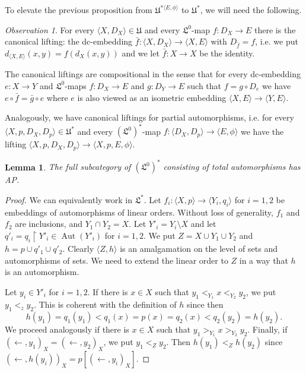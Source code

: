 \documentclass[oneside,notitlepage,12pt]{article}
\newtheorem{lm}[tw]{Lemma}
\theoremstyle{definition}
\theoremstyle{remark}
\newtheorem{observation}[tw]{Observation}
\newcommand \seq [1]{\langle #1 \rangle}
\newcommand \maps {\colon} %
\newcommand \im [1]{[#1]} %
\newcommand \from {\leftarrow}
\newcommand \cmp {\circ} %
\newcommand \Lin {\mathfrak{L}}
\newcommand \Ult {\mathfrak{U}}
\newcommand \Aut {\operatorname{Aut}}
\let \aut \Aut
\begin{document}
To elevate the previous proposition from $\Ult^{*\seq{E, \phi}}$ to $\Ult^*$, we will need the following.

\begin{observation} \label{obs:liftings}
    For every $\seq{X, D_X} \in \Ult$ and every $\Lin^0$-map $f\maps D_X \to E$ there is the canonical lifting: the dc-embedding $\bar{f}\maps \seq{X, D_X} \to \seq{X, E}$ with $D_{\bar{f}} = f$, i.e. we put $d_{\seq{X, E}}(x, y) = f(d_X(x, y))$ and we let $\bar{f}\maps X \to X$ be the identity.
    
    The canonical liftings are compositional in the sense that for every dc-embedding $e\maps X \to Y$ and $\Lin^0$-maps $f\maps D_X \to E$ and $g\maps D_Y \to E$ such that $f = g \cmp D_e$ we have $e \cmp \bar{f} = \bar{g} \cmp e$ where $e$ is also viewed as an isometric embedding $\seq{X, E} \to \seq{Y, E}$.
    
    Analogously, we have canonical liftings for partial automorphisms, i.e. for every $\seq{X, p, D_X, D_p} \in \Ult^*$ and every $(\Lin^0)^*$-map $f\maps \seq{D_X, D_p} \to \seq{E, \phi}$ we have the lifting $\seq{X, p, D_X, D_p} \to \seq{X, p, E, \phi}$.
\end{observation}

\begin{lm} \label{thm:order_auto_amalagamation}
    The full subcategory of $(\Lin^0)^*$ consisting of total automorphisms has AP.
\end{lm}
\begin{proof}
    We can equivalently work in $\Lin^*$.
    Let $f_i\maps \seq{X, p} \to \seq{Y_i, q_i}$ for $i = 1, 2$ be embeddings of automorphisms of linear orders.
    Without loss of generality, $f_1$ and $f_2$ are inclusions, and $Y_1 \cap Y_2 = X$.
    Let $Y'_i = Y_i \setminus X$ and let $q'_i=q_i\restriction Y'_i \in \aut(Y'_i)$ for $i = 1, 2$.
    We put $Z = X \cup Y_1 \cup Y_2$ and $h = p \cup q'_1 \cup q'_2$.
    Clearly $\seq{Z, h}$ is an amalgamation on the level of sets and automorphisms of sets.
    We need to extend the linear order to $Z$ in a way that $h$ is an automorphism.

    Let $y_i \in Y'_i$ for $i = 1, 2$.
    If there is $x \in X$ such that $y_1 <_{Y_1} x <_{Y_2} y_2$, we put $y_1 <_z y_2$.
    This is coherent with the definition of $h$ since then
    \[
        h(y_1) = q_1(y_1) < q_1(x) = p(x) = q_2(x) < q_2(y_2) = h(y_2).
    \]
    We proceed analogously if there is $x \in X$ such that $y_1 >_{Y_1} x >_{Y_2} y_2$.
    Finally, if $(\from, y_1)_X = (\from, y_2)_X$, we put $y_1 <_Z y_2$.
    Then $h(y_1) <_Z h(y_2)$ since $(\from, h(y_i))_X = p\im{(\from, y_i)_X}$.
\end{proof}
\end{document}
